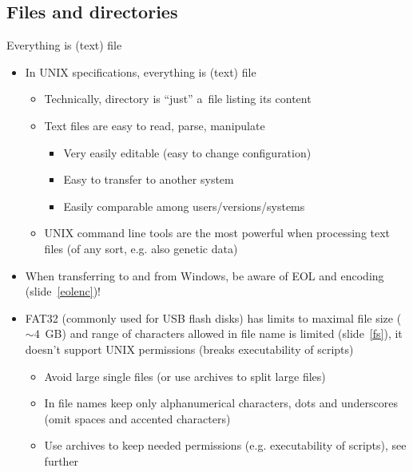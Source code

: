 \documentclass[compress, xelatex, 11pt, xcolor=svgnames, aspectratio=169, url={hyphens, lowtilde}]{beamer}
\begin{document}
\subsection{Files and directories}

\begin{frame}{Everything is (text) file}
	\begin{itemize}
		\item In UNIX specifications, everything is (text) file
		\begin{itemize}
			\item Technically, directory is \enquote{just} a~file listing its content
			\item Text files are easy to read, parse, manipulate
			\begin{itemize}
				\item Very easily editable (easy to change configuration)
				\item Easy to transfer to another system
				\item Easily comparable among users/versions/systems
			\end{itemize}
			\item UNIX command line tools are the most powerful when processing text files (of any sort, e.g. also genetic data)
		\end{itemize}
		\item When transferring to and from Windows, be aware of EOL and encoding (slide~\ref{eolenc})!
		\item FAT32 (commonly used for USB flash disks) has limits to maximal file size ($\sim4$~GB) and range of characters allowed in file name is limited (slide~\ref{fs}), it doesn't support UNIX permissions (breaks executability of scripts)
		\begin{itemize}
			\item Avoid large single files (or use archives to split large files)
			\item In file names keep only alphanumerical characters, dots and underscores (omit spaces and accented characters)
			\item Use archives to keep needed permissions (e.g. executability of scripts), see further
		\end{itemize}
		\end{itemize}
\end{frame}
\end{document}
